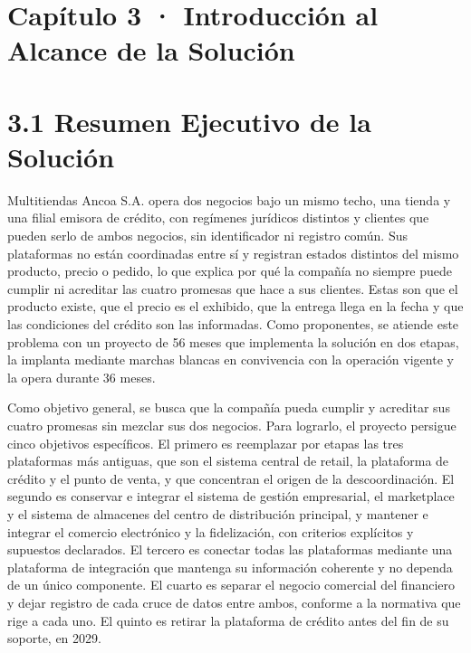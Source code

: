 \documentclass[11pt]{article}
\begin{document}
\renewcommand{\tablename}{Tabla}
\renewcommand{\figurename}{Figura}
\renewcommand{\thetable}{3.\arabic{table}}
\renewcommand{\thefigure}{3.\arabic{figure}}

\tableofcontents
\clearpage
\renewcommand{\listfigurename}{Lista de figuras}
\listoffigures
\clearpage
\renewcommand{\listtablename}{Lista de tablas}
\listoftables
\clearpage

\section{Capítulo 3 · Introducción al Alcance de la Solución}

\section{3.1 Resumen Ejecutivo de la Solución}

Multitiendas Ancoa S.A. opera dos negocios bajo un mismo techo, una tienda y una filial emisora de crédito, con regímenes jurídicos distintos y clientes que pueden serlo de ambos negocios, sin identificador ni registro común. Sus plataformas no están coordinadas entre sí y registran estados distintos del mismo producto, precio o pedido, lo que explica por qué la compañía no siempre puede cumplir ni acreditar las cuatro promesas que hace a sus clientes. Estas son que el producto existe, que el precio es el exhibido, que la entrega llega en la fecha y que las condiciones del crédito son las informadas. Como proponentes, se atiende este problema con un proyecto de 56 meses que implementa la solución en dos etapas, la implanta mediante marchas blancas en convivencia con la operación vigente y la opera durante 36 meses.

Como objetivo general, se busca que la compañía pueda cumplir y acreditar sus cuatro promesas sin mezclar sus dos negocios. Para lograrlo, el proyecto persigue cinco objetivos específicos. El primero es reemplazar por etapas las tres plataformas más antiguas, que son el sistema central de retail, la plataforma de crédito y el punto de venta, y que concentran el origen de la descoordinación. El segundo es conservar e integrar el sistema de gestión empresarial, el marketplace y el sistema de almacenes del centro de distribución principal, y mantener e integrar el comercio electrónico y la fidelización, con criterios explícitos y supuestos declarados. El tercero es conectar todas las plataformas mediante una plataforma de integración que mantenga su información coherente y no dependa de un único componente. El cuarto es separar el negocio comercial del financiero y dejar registro de cada cruce de datos entre ambos, conforme a la normativa que rige a cada uno. El quinto es retirar la plataforma de crédito antes del fin de su soporte, en 2029.
\end{document}

